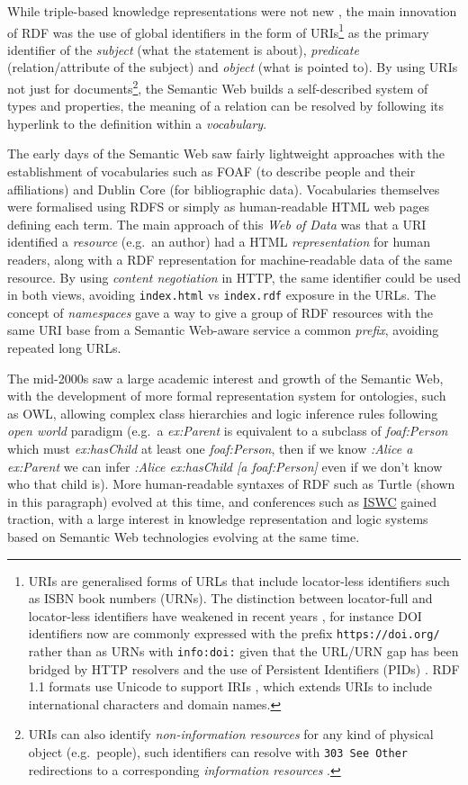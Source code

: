 \documentclass[fleqn,10pt,lineno]{wlpeerjlua}
\begin{document}
While triple-based knowledge representations were not new \cite{NxvhwSmG}, the main innovation of RDF was the use of global identifiers in the form of URIs\footnote{URIs \cite{RRtwPF7Y} are generalised forms of URLs that include locator-less identifiers such as ISBN book numbers (URNs). The distinction between locator-full and locator-less identifiers have weakened in recent years \cite{nW4HY8Nq}, for instance DOI identifiers now are commonly expressed with the prefix \texttt{https://doi.org/} rather than as URNs with \texttt{info:doi:} given that the URL/URN gap has been bridged by HTTP resolvers and the use of Persistent Identifiers (PIDs) \cite{HqZ3r6J3}. RDF 1.1 formats use Unicode to support IRIs \cite{rqjuXkEf}, which extends URIs to include international characters and domain names.} as the primary identifier of the \emph{subject} (what the statement is about), \emph{predicate} (relation/attribute of the subject) and \emph{object} (what is pointed to). By using URIs not just for documents\footnote{URIs can also identify \emph{non-information resources} for any kind of physical object (e.g.~people), such identifiers can resolve with \texttt{303\ See\ Other} redirections to a corresponding \emph{information resources} \cite{rnzJ4khD}.}, the Semantic Web builds a self-described system of types and properties, the meaning of a relation can be resolved by following its hyperlink to the definition within a \emph{vocabulary}.

The early days of the Semantic Web saw fairly lightweight approaches with the establishment of vocabularies such as FOAF (to describe people and their affiliations) and Dublin Core (for bibliographic data). Vocabularies themselves were formalised using RDFS or simply as human-readable HTML web pages defining each term. The main approach of this \emph{Web of Data} was that a URI identified a \emph{resource} (e.g.~an author) had a HTML \emph{representation} for human readers, along with a RDF representation for machine-readable data of the same resource. By using \emph{content negotiation} in HTTP, the same identifier could be used in both views, avoiding \texttt{index.html} vs \texttt{index.rdf} exposure in the URLs. The concept of \emph{namespaces} gave a way to give a group of RDF resources with the same URI base from a Semantic Web-aware service a common \emph{prefix}, avoiding repeated long URLs.

The mid-2000s saw a large academic interest and growth of the Semantic Web, with the development of more formal representation system for ontologies, such as OWL, allowing complex class hierarchies and logic inference rules following \emph{open world} paradigm (e.g.~a \emph{ex:Parent} is equivalent to a subclass of \emph{foaf:Person} which must \emph{ex:hasChild} at least one \emph{foaf:Person}, then if we know \emph{:Alice a ex:Parent} we can infer \emph{:Alice ex:hasChild {[}a foaf:Person{]}} even if we don't know who that child is). More human-readable syntaxes of RDF such as Turtle (shown in this paragraph) evolved at this time, and conferences such as \href{https://iswc2022.semanticweb.org/}{ISWC} \cite{yd2WE9eq} gained traction, with a large interest in knowledge representation and logic systems based on Semantic Web technologies evolving at the same time.
\end{document}
